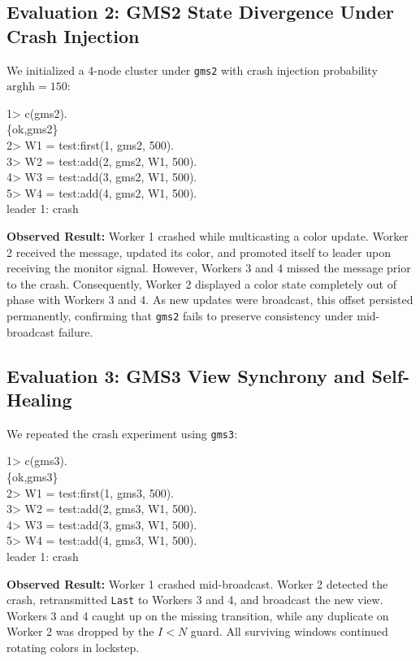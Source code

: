 \documentclass[a4paper, 11pt]{article}
\begin{document}
\subsection{Evaluation 2: GMS2 State Divergence Under Crash Injection}
We initialized a 4-node cluster under \texttt{gms2} with crash injection probability $\text{arghh} = 150$:
\begin{tcolorbox}[terminalbox]
1> c(gms2). \\
\{ok,gms2\} \\
2> W1 = test:first(1, gms2, 500). \\
3> W2 = test:add(2, gms2, W1, 500). \\
4> W3 = test:add(3, gms2, W1, 500). \\
5> W4 = test:add(4, gms2, W1, 500). \\
leader 1: crash
\end{tcolorbox}
\textbf{Observed Result:} Worker 1 crashed while multicasting a color update. Worker 2 received the message, updated its color, and promoted itself to leader upon receiving the monitor signal. However, Workers 3 and 4 missed the message prior to the crash. Consequently, Worker 2 displayed a color state completely out of phase with Workers 3 and 4. As new updates were broadcast, this offset persisted permanently, confirming that \texttt{gms2} fails to preserve consistency under mid-broadcast failure.

\subsection{Evaluation 3: GMS3 View Synchrony and Self-Healing}
We repeated the crash experiment using \texttt{gms3}:
\begin{tcolorbox}[terminalbox]
1> c(gms3). \\
\{ok,gms3\} \\
2> W1 = test:first(1, gms3, 500). \\
3> W2 = test:add(2, gms3, W1, 500). \\
4> W3 = test:add(3, gms3, W1, 500). \\
5> W4 = test:add(4, gms3, W1, 500). \\
leader 1: crash
\end{tcolorbox}
\textbf{Observed Result:} Worker 1 crashed mid-broadcast. Worker 2 detected the crash, retransmitted \texttt{Last} to Workers 3 and 4, and broadcast the new view. Workers 3 and 4 caught up on the missing transition, while any duplicate on Worker 2 was dropped by the $I < N$ guard. All surviving windows continued rotating colors in lockstep.
\end{document}
